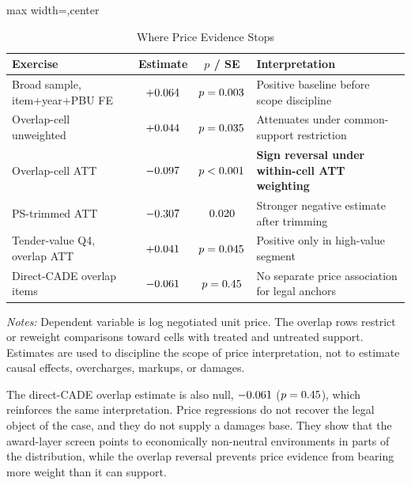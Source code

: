 \begin{table}[htbp]
\centering
\caption{Where Price Evidence Stops}
\label{tab:price_scope_submission}
\footnotesize
\begin{adjustbox}{max width=\textwidth,center}
\begin{threeparttable}
\begin{tabular}{p{5.2cm}ccp{4.8cm}}
\toprule
Exercise & Estimate & $p$ / SE & Interpretation \\
\midrule
Broad sample, item+year+PBU FE & $+0.064$ &
$p=0.003$ & Positive baseline before scope discipline \\
Overlap-cell unweighted & $+0.044$ &
$p=0.035$ & Attenuates under common-support restriction \\
Overlap-cell ATT & $-0.097$ &
$p<0.001$ & \textbf{Sign reversal under within-cell ATT weighting} \\
PS-trimmed ATT & $-0.307$ &
$0.020$ & Stronger negative estimate after trimming \\
Tender-value Q4, overlap ATT & $+0.041$ &
$p=0.045$ & Positive only in high-value segment \\
Direct-CADE overlap items & $-0.061$ &
$p=0.45$ & No separate price association for legal anchors \\
\bottomrule
\end{tabular}
\begin{tablenotes}
\footnotesize
\item \textit{Notes:} Dependent variable is log negotiated unit
price. The overlap rows restrict or reweight comparisons toward
cells with treated and untreated support. Estimates are used to
discipline the scope of price interpretation, not to estimate
causal effects, overcharges, markups, or damages.
\end{tablenotes}
\end{threeparttable}
\end{adjustbox}
\end{table}

The direct-CADE overlap estimate is also null,
$-0.061$ ($p=0.45$), which reinforces
the same interpretation. Price regressions do not recover the
legal object of the case, and they do not supply a damages base.
They show that the award-layer screen points to economically
non-neutral environments in parts of the distribution, while the
overlap reversal prevents price evidence from bearing more
weight than it can support.

